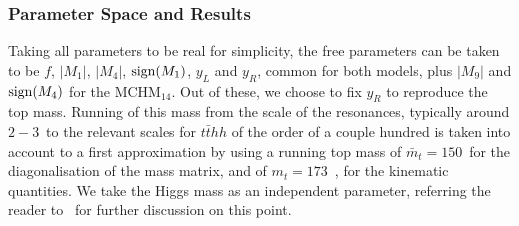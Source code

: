 \subsubsection*{Parameter Space and Results}
\label{analysis}
Taking all parameters to be real for simplicity, the free parameters can be taken to be $f$, $|M_1|$, $|M_4|$, ${\rm sign}(M_1)$, $y_L$ and $y_R$, common for both models, plus $|M_9|$ and ${\rm sign}(M_4)$ for the MCHM$_{14}$.
Out of these, we choose to fix $y_R$ to reproduce the top mass. Running of this mass from the scale of the resonances, typically around $2-3$~\UTeV to the relevant scales for $t\bar{t}hh$ of the order of a
couple hundred \UGeV is taken into account to a first approximation by using a running top mass of $\bar{m}_t = 150$~\UGeV for the diagonalisation of the mass
matrix, and of $m_t = 173$~\UGeV, for the kinematic quantities.   We take the Higgs mass as an independent parameter,
referring the reader to~\cite{MCHMtthh} for further discussion on this point.

